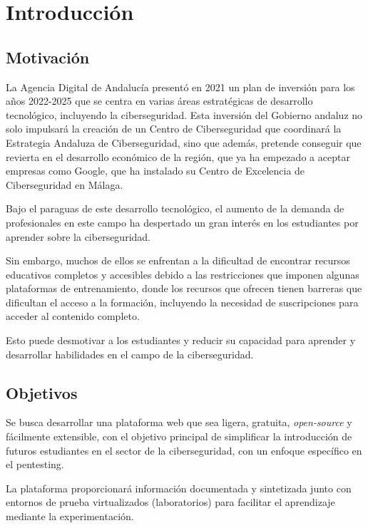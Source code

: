 \chapter{Introducción}

    \section{Motivación}
        
        La Agencia Digital de Andalucía presentó en 2021 un plan de inversión para los años 2022-2025 que se centra en varias áreas estratégicas de desarrollo tecnológico, incluyendo la ciberseguridad. Esta inversión del Gobierno andaluz no solo impulsará la creación de un Centro de Ciberseguridad que coordinará la Estrategia Andaluza de Ciberseguridad, sino que además, pretende conseguir que revierta en el desarrollo económico de la región, que ya ha empezado a aceptar empresas como Google, que ha instalado su Centro de Excelencia de Ciberseguridad en Málaga.
        
        Bajo el paraguas de este desarrollo tecnológico, el aumento de la demanda de profesionales en este campo ha despertado un gran interés en los estudiantes por aprender sobre la ciberseguridad.
        
        Sin embargo, muchos de ellos se enfrentan a la dificultad de encontrar recursos educativos completos y accesibles debido a las restricciones que imponen algunas plataformas de entrenamiento, donde los recursos que ofrecen tienen barreras que dificultan el acceso a la formación, incluyendo la necesidad de suscripciones para acceder al contenido completo.
        
        Esto puede desmotivar a los estudiantes y reducir su capacidad para aprender y desarrollar habilidades en el campo de la ciberseguridad.
    
    
    \section{Objetivos}
        \label{sec:objetivos}
    
        Se busca desarrollar una plataforma web que sea ligera, gratuita, \textit{open-source} y fácilmente extensible, con el objetivo principal de simplificar la introducción de futuros estudiantes en el sector de la ciberseguridad, con un enfoque específico en el pentesting.
        
        La plataforma proporcionará información documentada y sintetizada junto con entornos de prueba virtualizados (laboratorios) para facilitar el aprendizaje mediante la experimentación.
        
